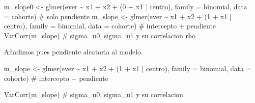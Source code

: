 \documentclass[
  letterpaper,
  DIV=11,
  numbers=noendperiod]{scrartcl}
\newenvironment{Shaded}{\begin{snugshade}}{\end{snugshade}}
\newcommand{\AttributeTok}[1]{\textcolor[rgb]{0.40,0.45,0.13}{#1}}
\newcommand{\CommentTok}[1]{\textcolor[rgb]{0.37,0.37,0.37}{#1}}
\newcommand{\DecValTok}[1]{\textcolor[rgb]{0.68,0.00,0.00}{#1}}
\newcommand{\FunctionTok}[1]{\textcolor[rgb]{0.28,0.35,0.67}{#1}}
\newcommand{\NormalTok}[1]{\textcolor[rgb]{0.00,0.23,0.31}{#1}}
\newcommand{\OtherTok}[1]{\textcolor[rgb]{0.00,0.23,0.31}{#1}}
\newcommand{\SpecialCharTok}[1]{\textcolor[rgb]{0.37,0.37,0.37}{#1}}
\begin{document}
\begin{tcolorbox}[enhanced jigsaw, breakable, colframe=quarto-callout-tip-color-frame, left=2mm, arc=.35mm, colbacktitle=quarto-callout-tip-color!10!white, toprule=.15mm, colback=white, coltitle=black, rightrule=.15mm, opacitybacktitle=0.6, title=\textcolor{quarto-callout-tip-color}{\faLightbulb}\hspace{0.5em}{🔧 En R. Añadir una pendiente aleatoria}, titlerule=0mm, toptitle=1mm, bottomtitle=1mm, leftrule=.75mm, bottomrule=.15mm, opacityback=0]

\begin{Shaded}
\begin{Highlighting}[]
\NormalTok{m\_slope0 }\OtherTok{\textless{}{-}} \FunctionTok{glmer}\NormalTok{(ever }\SpecialCharTok{\textasciitilde{}}\NormalTok{ x1 }\SpecialCharTok{+}\NormalTok{ x2 }\SpecialCharTok{+}\NormalTok{ (}\DecValTok{0} \SpecialCharTok{+}\NormalTok{ x1 }\SpecialCharTok{|}\NormalTok{ centro), }\AttributeTok{family =}\NormalTok{ binomial, }\AttributeTok{data =}\NormalTok{ cohorte)  }\CommentTok{\# solo pendiente}
\NormalTok{m\_slope  }\OtherTok{\textless{}{-}} \FunctionTok{glmer}\NormalTok{(ever }\SpecialCharTok{\textasciitilde{}}\NormalTok{ x1 }\SpecialCharTok{+}\NormalTok{ x2 }\SpecialCharTok{+}\NormalTok{ (}\DecValTok{1} \SpecialCharTok{+}\NormalTok{ x1 }\SpecialCharTok{|}\NormalTok{ centro), }\AttributeTok{family =}\NormalTok{ binomial, }\AttributeTok{data =}\NormalTok{ cohorte)  }\CommentTok{\# intercepto + pendiente}
\FunctionTok{VarCorr}\NormalTok{(m\_slope)   }\CommentTok{\# sigma\_u0, sigma\_u1 y su correlacion rho}
\end{Highlighting}
\end{Shaded}

\end{tcolorbox}

Añadimos pues pendiente aleatoria al modelo.

\begin{Shaded}
\begin{Highlighting}[]
\NormalTok{m\_slope  }\OtherTok{\textless{}{-}} \FunctionTok{glmer}\NormalTok{(ever }\SpecialCharTok{\textasciitilde{}}\NormalTok{ x1 }\SpecialCharTok{+}\NormalTok{ x2 }\SpecialCharTok{+}\NormalTok{ (}\DecValTok{1} \SpecialCharTok{+}\NormalTok{ x1 }\SpecialCharTok{|}\NormalTok{ centro), }\AttributeTok{family =}\NormalTok{ binomial, }\AttributeTok{data =}\NormalTok{ cohorte)  }\CommentTok{\# intercepto + pendiente}

\FunctionTok{VarCorr}\NormalTok{(m\_slope)        }\CommentTok{\# sigma\_u0, sigma\_u1 y su correlacion}
\end{Highlighting}
\end{Shaded}
\end{document}
